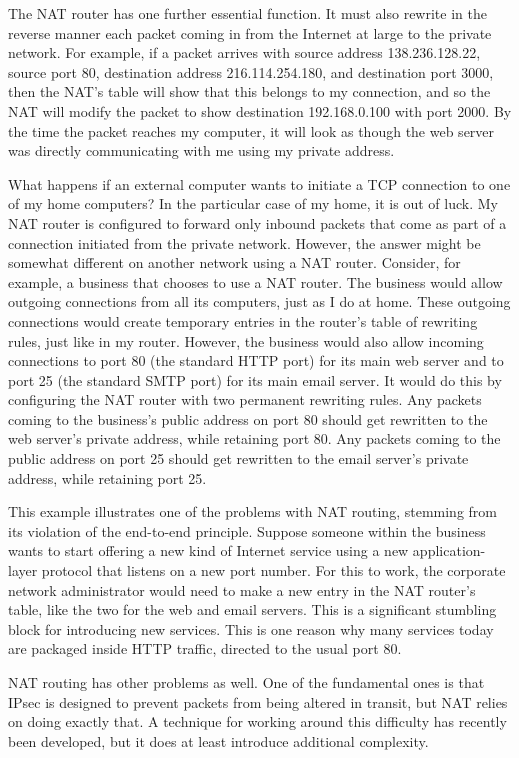 The NAT router has one further essential function.  It must also rewrite
in the reverse manner each packet coming in from the Internet at large
to the private network.  For example, if a packet arrives with
source address 138.236.128.22, source port 80, destination address 216.114.254.180, and destination port 3000,
then the NAT's table will show that this belongs to my connection, and
so the NAT will modify the packet to show destination 192.168.0.100
with port 2000.  By the time the packet reaches my computer, it will
look as though the web server was directly communicating with me using
my private address.

What happens if an external computer wants to initiate a TCP
connection to one of my home computers?  In the particular case of my
home, it is out of luck.  My NAT router is configured to forward only
inbound packets that come as part of a connection initiated from the
private network. However, the answer might be somewhat different on
another network using a NAT router.  Consider, for example, a business
that chooses to use a NAT router.
The business would allow outgoing connections from all its computers,
just as I do at home.  These outgoing connections would create
temporary entries in the router's table of rewriting rules, just like
in my router.  However, the business would also allow incoming
connections to port 80 (the standard HTTP port) for its main web
server and to port 25 (the standard SMTP port) for its main email
server.  It would do this by configuring the NAT router with two
permanent rewriting rules.  Any packets coming to the business's
public address on port 80 should get rewritten to the web server's
private address, while retaining port 80.  Any packets coming to the
public address on port 25 should get rewritten to the email server's
private address, while retaining port 25.

This example illustrates one of the problems with NAT routing,
stemming from its violation of the end-to-end principle.  Suppose
someone within the business wants to start offering a new kind of
Internet service using a new application-layer protocol that listens
on a new port number.  For this to work, the corporate network
administrator would need to make a new entry in the NAT router's
table, like the two for the web and email servers.  This is a
significant stumbling block for introducing new services.  This is one
reason why many services today are packaged inside HTTP traffic,
directed to the usual port 80.

NAT routing has other problems as well.  One of the fundamental ones
is that IPsec is designed to prevent packets from being altered in
transit, but NAT relies on doing exactly that.  A technique for
working around this difficulty has recently been developed, but it
does at least introduce additional complexity.

